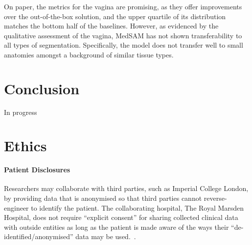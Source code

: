 \documentclass[11pt,twoside]{report}
\begin{document}
On paper, the metrics for the vagina are promising, as they offer improvements over the out-of-the-box solution, and the upper quartile of its distribution matches the bottom half of the baselines. However, as evidenced by the qualitative assessment of the vagina, MedSAM has not shown transferability to all types of segmentation. Specifically, the model does not transfer well to small anatomies amongst a background of similar tissue types. %

\chapter{Conclusion}\label{sect:conclusion}

In progress





\chapter{Ethics}

\subsubsection{Patient Disclosures}

Researchers may collaborate with third parties, such as Imperial College London, by providing data that is anonymised so that third parties cannot reverse-engineer to identify the patient. The collaborating hospital, The Royal Marsden Hospital, does not require ``explicit consent'' for sharing collected clinical data with outside entities as long as the patient is made aware of the ways their ``de-identified/anonymised'' data may be used.~\cite{royal-marsden-privacy-note}. 
\end{document}
